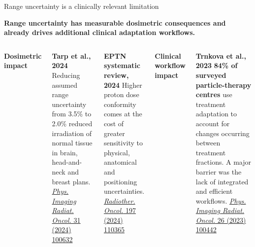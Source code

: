\documentclass[aspectratio=169,11pt]{beamer}
\begin{document}
\begin{frame}{Range uncertainty is a clinically relevant limitation}

\vspace{-0.05cm}

\begin{center}
{\small\bfseries\color{darkred}
Range uncertainty has measurable dosimetric consequences and already drives additional clinical adaptation workflows.
}
\end{center}

\vspace{0.10cm}

\begin{columns}[T,onlytextwidth]


{\footnotesize\bfseries\color{PTblue}
Dosimetric impact
}

\vspace{0.10cm}

{\tiny

\textbf{Tarp et al., 2024}  
Reducing assumed range uncertainty from 3.5\% to 2.0\% reduced irradiation of normal tissue in brain, head-and-neck and breast plans.  
\href{https://doi.org/10.1016/j.phro.2024.100632}
{\textit{Phys. Imaging Radiat. Oncol.} 31 (2024) 100632}

\vspace{0.16cm}

\textbf{EPTN systematic review, 2024}  
Higher proton dose conformity comes at the cost of greater sensitivity to physical, anatomical and positioning uncertainties.  
\href{https://doi.org/10.1016/j.radonc.2024.110365}
{\textit{Radiother. Oncol.} 197 (2024) 110365}

}


{\footnotesize\bfseries\color{PTblue}
Clinical workflow impact
}

\vspace{0.10cm}

{\tiny

\textbf{Trnkova et al., 2023}  
\textbf{84\% of surveyed particle-therapy centres} use treatment adaptation to account for changes occurring between treatment fractions. A major barrier was the lack of integrated and efficient workflows.  
\href{https://doi.org/10.1016/j.phro.2023.100442}
{\textit{Phys. Imaging Radiat. Oncol.} 26 (2023) 100442}

}
\end{columns}
\end{frame}
\end{document}
